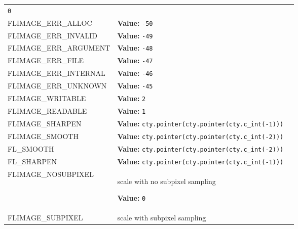\begin{longtable}{|p{\varnamewidth}|p{\vardescrwidth}|l}
{\tt 0}&\\
\cline{1-2}
\raggedright F\-L\-I\-M\-A\-G\-E\-\_\-E\-R\-R\-\_\-A\-L\-L\-O\-C\- & \raggedright \textbf{Value:} 
{\tt -50}&\\
\cline{1-2}
\raggedright F\-L\-I\-M\-A\-G\-E\-\_\-E\-R\-R\-\_\-I\-N\-V\-A\-L\-I\-D\- & \raggedright \textbf{Value:} 
{\tt -49}&\\
\cline{1-2}
\raggedright F\-L\-I\-M\-A\-G\-E\-\_\-E\-R\-R\-\_\-A\-R\-G\-U\-M\-E\-N\-T\- & \raggedright \textbf{Value:} 
{\tt -48}&\\
\cline{1-2}
\raggedright F\-L\-I\-M\-A\-G\-E\-\_\-E\-R\-R\-\_\-F\-I\-L\-E\- & \raggedright \textbf{Value:} 
{\tt -47}&\\
\cline{1-2}
\raggedright F\-L\-I\-M\-A\-G\-E\-\_\-E\-R\-R\-\_\-I\-N\-T\-E\-R\-N\-A\-L\- & \raggedright \textbf{Value:} 
{\tt -46}&\\
\cline{1-2}
\raggedright F\-L\-I\-M\-A\-G\-E\-\_\-E\-R\-R\-\_\-U\-N\-K\-N\-O\-W\-N\- & \raggedright \textbf{Value:} 
{\tt -45}&\\
\cline{1-2}
\raggedright F\-L\-I\-M\-A\-G\-E\-\_\-W\-R\-I\-T\-A\-B\-L\-E\- & \raggedright \textbf{Value:} 
{\tt 2}&\\
\cline{1-2}
\raggedright F\-L\-I\-M\-A\-G\-E\-\_\-R\-E\-A\-D\-A\-B\-L\-E\- & \raggedright \textbf{Value:} 
{\tt 1}&\\
\cline{1-2}
\raggedright F\-L\-I\-M\-A\-G\-E\-\_\-S\-H\-A\-R\-P\-E\-N\- & \raggedright \textbf{Value:} 
{\tt cty.pointer(cty.pointer(cty.c\_int(-1)))}&\\
\cline{1-2}
\raggedright F\-L\-I\-M\-A\-G\-E\-\_\-S\-M\-O\-O\-T\-H\- & \raggedright \textbf{Value:} 
{\tt cty.pointer(cty.pointer(cty.c\_int(-2)))}&\\
\cline{1-2}
\raggedright F\-L\-\_\-S\-M\-O\-O\-T\-H\- & \raggedright \textbf{Value:} 
{\tt cty.pointer(cty.pointer(cty.c\_int(-2)))}&\\
\cline{1-2}
\raggedright F\-L\-\_\-S\-H\-A\-R\-P\-E\-N\- & \raggedright \textbf{Value:} 
{\tt cty.pointer(cty.pointer(cty.c\_int(-1)))}&\\
\cline{1-2}
\raggedright F\-L\-I\-M\-A\-G\-E\-\_\-N\-O\-S\-U\-B\-P\-I\-X\-E\-L\- & \raggedright scale with no subpixel sampling

\textbf{Value:} 
{\tt 0}&\\
\cline{1-2}
\raggedright F\-L\-I\-M\-A\-G\-E\-\_\-S\-U\-B\-P\-I\-X\-E\-L\- & \raggedright scale with subpixel sampling


\end{longtable}
